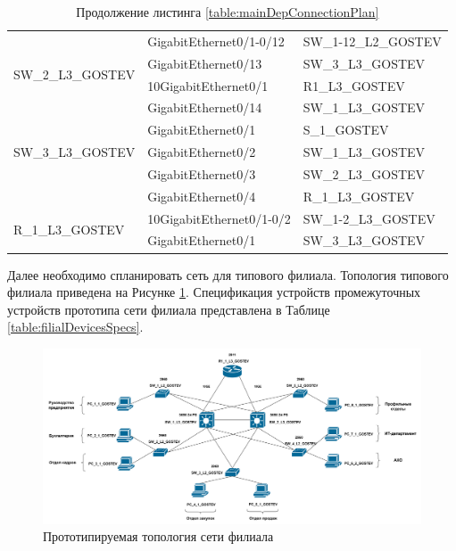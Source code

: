 \documentclass[14pt, a4paper]{extarticle}
\numberwithin{equation}{section}
\begin{document}
\newpage
\begin{table}[H]
\small
\centering
\caption*{Продолжение листинга \ref{table:mainDepConnectionPlan}}
\begin{tabular}{|l|l|l|}
\hline
\multirow{4}{*}{SW\_2\_L3\_GOSTEV}  & GigabitEthernet0/1-0/12  & SW\_1-12\_L2\_GOSTEV          \\ \cline{2-3} 
                                    & GigabitEthernet0/13      & SW\_3\_L3\_GOSTEV             \\ \cline{2-3} 
                                    & 10GigabitEthernet0/1     & R1\_L3\_GOSTEV                \\ \cline{2-3} 
                                    & GigabitEthernet0/14      & SW\_1\_L3\_GOSTEV             \\ \hline
\multirow{3}{*}{SW\_3\_L3\_GOSTEV}  & GigabitEthernet0/1       & S\_1\_GOSTEV                  \\ \cline{2-3} 
                                    & GigabitEthernet0/2       & SW\_1\_L3\_GOSTEV             \\ \cline{2-3} 
                                    & GigabitEthernet0/3       & SW\_2\_L3\_GOSTEV             \\ \cline{2-3}
                                    & GigabitEthernet0/4       & R\_1\_L3\_GOSTEV              \\ \hline
\multirow{2}{*}{R\_1\_L3\_GOSTEV}   & 10GigabitEthernet0/1-0/2 & SW\_1-2\_L3\_GOSTEV           \\ \cline{2-3} 
                                    & GigabitEthernet0/1       & SW\_3\_L3\_GOSTEV             \\ \hline
\end{tabular}
\end{table}
Далее необходимо спланировать сеть для типового филиала.
Топология типового филиала приведена на Рисунке \ref{fig:filialTopo}.
Спецификация устройств промежуточных устройств прототипа сети филиала представлена в Таблице \ref{table:filialDevicesSpecs}.

\begin{landscape}
\begin{figure}[H]
        \centering
        \includegraphics[scale=0.17]{topo_filial.png}
        \caption{Прототипируемая топология сети филиала}
        \label{fig:filialTopo}
\end{figure}
\end{landscape}
\end{document}
